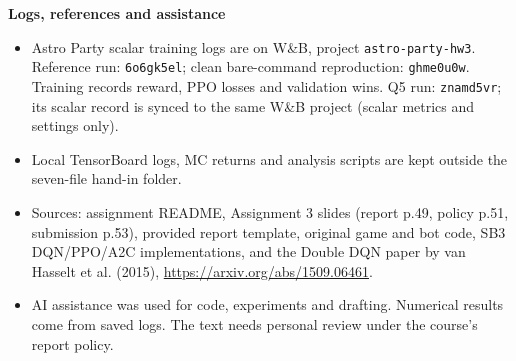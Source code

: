 \documentclass[a4paper]{article}
\begin{document}
\begin{answer}
\begin{itemize}
\end{itemize}
\textbf{Logs, references and assistance}
\begin{itemize}
\item Astro Party scalar training logs are on W\&B, project \texttt{astro-party-hw3}. Reference run: \texttt{6o6gk5el}; clean bare-command reproduction: \texttt{ghme0u0w}. Training records reward, PPO losses and validation wins. Q5 run: \texttt{znamd5vr}; its scalar record is synced to the same W\&B project (scalar metrics and settings only).
\item Local TensorBoard logs, MC returns and analysis scripts are kept outside the seven-file hand-in folder.
\item Sources: assignment README, Assignment 3 slides (report p.49, policy p.51, submission p.53), provided report template, original game and bot code, SB3 DQN/PPO/A2C implementations, and the Double DQN paper by van Hasselt et al. (2015), \url{https://arxiv.org/abs/1509.06461}.
\item AI assistance was used for code, experiments and drafting. Numerical results come from saved logs. The text needs personal review under the course's report policy.
\end{itemize}
\end{answer}
\end{document}
